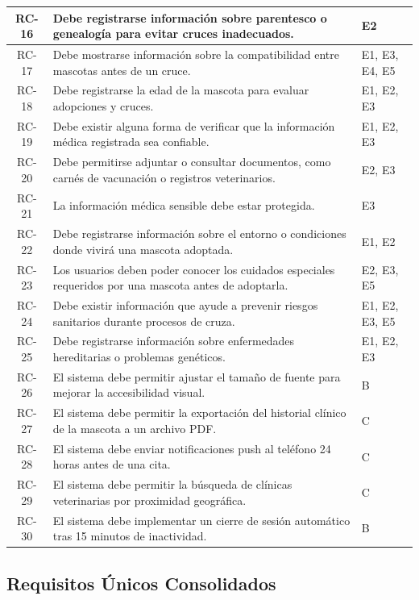 \documentclass[journal,onecolumn]{IEEEtran}
\begin{document}
\begin{longtable}{|c|p{8.5cm}|p{2cm}|}
\hline
RC-16 & Debe registrarse información sobre parentesco o genealogía para evitar cruces inadecuados. & E2 \\
\hline
RC-17 & Debe mostrarse información sobre la compatibilidad entre mascotas antes de un cruce. & E1, E3, E4, E5 \\
\hline
RC-18 & Debe registrarse la edad de la mascota para evaluar adopciones y cruces. & E1, E2, E3 \\
\hline
RC-19 & Debe existir alguna forma de verificar que la información médica registrada sea confiable. & E1, E2, E3 \\
\hline
RC-20 & Debe permitirse adjuntar o consultar documentos, como carnés de vacunación o registros veterinarios. & E2, E3 \\
\hline
RC-21 & La información médica sensible debe estar protegida. & E3 \\
\hline
RC-22 & Debe registrarse información sobre el entorno o condiciones donde vivirá una mascota adoptada. & E1, E2 \\
\hline
RC-23 & Los usuarios deben poder conocer los cuidados especiales requeridos por una mascota antes de adoptarla. & E2, E3, E5 \\
\hline
RC-24 & Debe existir información que ayude a prevenir riesgos sanitarios durante procesos de cruza. & E1, E2, E3, E5 \\
\hline
RC-25 & Debe registrarse información sobre enfermedades hereditarias o problemas genéticos. & E1, E2, E3 \\
\hline
RC-26 & El sistema debe permitir ajustar el tamaño de fuente para mejorar la accesibilidad visual. & B \\
\hline
RC-27 & El sistema debe permitir la exportación del historial clínico de la mascota a un archivo PDF. & C \\
\hline
RC-28 & El sistema debe enviar notificaciones push al teléfono 24 horas antes de una cita. & C \\
\hline
RC-29 & El sistema debe permitir la búsqueda de clínicas veterinarias por proximidad geográfica. & C \\
\hline
RC-30 & El sistema debe implementar un cierre de sesión automático tras 15 minutos de inactividad. & B \\
\hline
\end{longtable}

\subsection{Requisitos Únicos Consolidados}
\end{document}
